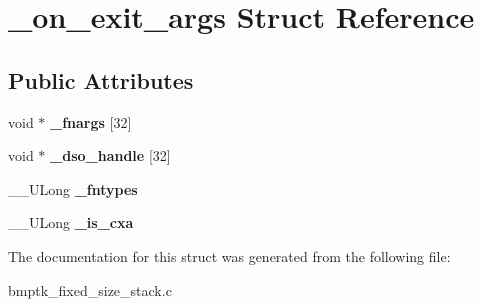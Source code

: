 \hypertarget{struct__on__exit__args}{}\section{\+\_\+on\+\_\+exit\+\_\+args Struct Reference}
\label{struct__on__exit__args}
\subsection*{Public Attributes}
\begin{DoxyCompactItemize}
\item 
void $\ast$ {\bfseries \+\_\+fnargs} \mbox{[}32\mbox{]}\hypertarget{struct__on__exit__args_a2da58410f4e2064753e0a03b3329e217}{}\label{struct__on__exit__args_a2da58410f4e2064753e0a03b3329e217}

\item 
void $\ast$ {\bfseries \+\_\+dso\+\_\+handle} \mbox{[}32\mbox{]}\hypertarget{struct__on__exit__args_aeedd271270a8fbaa8fb63485d13fb9ad}{}\label{struct__on__exit__args_aeedd271270a8fbaa8fb63485d13fb9ad}

\item 
\+\_\+\+\_\+\+U\+Long {\bfseries \+\_\+fntypes}\hypertarget{struct__on__exit__args_a6a644abb06d150accb5a8e52a9168933}{}\label{struct__on__exit__args_a6a644abb06d150accb5a8e52a9168933}

\item 
\+\_\+\+\_\+\+U\+Long {\bfseries \+\_\+is\+\_\+cxa}\hypertarget{struct__on__exit__args_ad8a3d7f8d64650465196dd8ba4724ba0}{}\label{struct__on__exit__args_ad8a3d7f8d64650465196dd8ba4724ba0}

\end{DoxyCompactItemize}


The documentation for this struct was generated from the following file\+:\begin{DoxyCompactItemize}
\item 
bmptk\+\_\+fixed\+\_\+size\+\_\+stack.\+c\end{DoxyCompactItemize}
